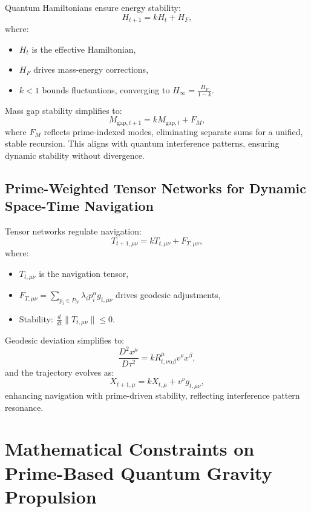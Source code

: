 \documentclass{article}
\theoremstyle{plain}
\begin{document}
Quantum Hamiltonians ensure energy stability:
\begin{equation}
    H_{t+1} = k H_t + H_F,
\end{equation}
where:
\begin{itemize}
    \item \( H_t \) is the effective Hamiltonian,
    \item \( H_F \) drives mass-energy corrections,
    \item \( k < 1 \) bounds fluctuations, converging to \( H_\infty = \frac{H_F}{1 - k} \).
\end{itemize}
Mass gap stability simplifies to:
\begin{equation}
    M_{\text{gap},t+1} = k M_{\text{gap},t} + F_M,
\end{equation}
where \( F_M \) reflects prime-indexed modes, eliminating separate sums for a unified, stable recursion. This aligns with quantum interference patterns, ensuring dynamic stability without divergence.

\subsection{Prime-Weighted Tensor Networks for Dynamic Space-Time Navigation}
\label{subsec:space_time_navigation}

Tensor networks regulate navigation:
\begin{equation}
    T_{t+1,\mu\nu} = k T_{t,\mu\nu} + F_{T,\mu\nu},
\end{equation}
where:
\begin{itemize}
    \item \( T_{t,\mu\nu} \) is the navigation tensor,
    \item \( F_{T,\mu\nu} = \sum_{p_i \in P_N} \lambda_i p_i^\alpha g_{t,\mu\nu} \) drives geodesic adjustments,
    \item Stability: \( \frac{d}{dt} \| T_{t,\mu\nu} \| \leq 0 \).
\end{itemize}
Geodesic deviation simplifies to:
\begin{equation}
    \frac{D^2 x^\mu}{D\tau^2} = k R^\mu_{t,\nu\alpha\beta} v^\nu x^\beta,
\end{equation}
and the trajectory evolves as:
\begin{equation}
    X_{t+1,\mu} = k X_{t,\mu} + v^\nu g_{t,\mu\nu},
\end{equation}
enhancing navigation with prime-driven stability, reflecting interference pattern resonance.

\section{Mathematical Constraints on Prime-Based Quantum Gravity Propulsion}
\label{sec:constraints}
\end{document}
